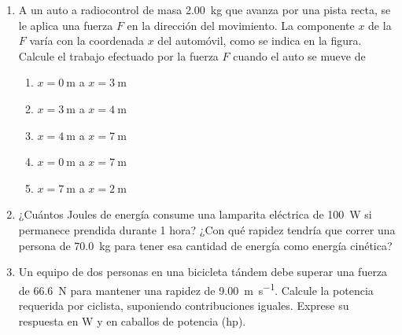 \documentclass[Física - Práctica.root.tex]{subfiles}
\begin{document}
\begin{enumerate}
  \item A un auto a radiocontrol de masa \SI{2,00}{\kilo\gram} que avanza por una pista recta, se le aplica una
        fuerza $F$ en la dirección del movimiento. La componente $x$ de la $F$ varía con la coordenada
        $x$ del automóvil, como se indica en la figura. Calcule el trabajo efectuado por la fuerza $F$
        cuando el auto se mueve de
        \begin{center}
        \end{center}
        \begin{multicols}{2}
          \begin{enumerate}
            \item $x = \SI{0}{\meter}$ a $x = \SI{3}{\meter}$
            \item $x = \SI{3}{\meter}$ a $x = \SI{4}{\meter}$
            \item $x = \SI{4}{\meter}$ a $x = \SI{7}{\meter}$
            \item $x = \SI{0}{\meter}$ a $x = \SI{7}{\meter}$
            \item $x = \SI{7}{\meter}$ a $x = \SI{2}{\meter}$
          \end{enumerate}
        \end{multicols}

  \item ¿Cuántos Joules de energía consume una lamparita eléctrica de \SI{100}{\watt} si permanece
        prendida durante 1 hora? ¿Con qué rapidez tendría que correr una persona de \SI{70,0}{\kilo\gram} para
        tener esa cantidad de energía como energía cinética?

  \item Un equipo de dos personas en una bicicleta tándem debe superar una fuerza de \SI{66,6}{\newton}
        para mantener una rapidez de \SI[per-mode=fraction]{9,00}{\meter\per\second}. Calcule la potencia requerida por ciclista,
        suponiendo contribuciones iguales. Exprese su respuesta en \si{\watt} y en caballos de potencia (hp).


\end{enumerate}
\end{document}
